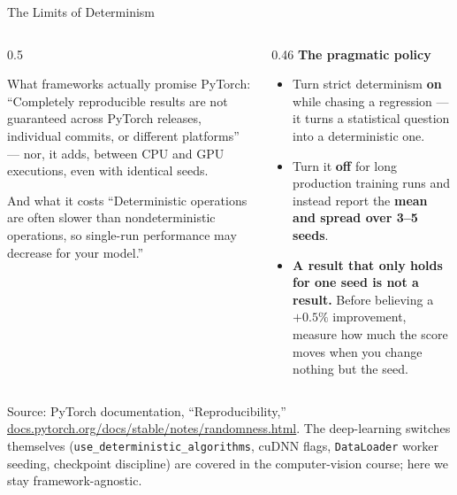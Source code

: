 \begin{frame}{The Limits of Determinism}

    \begin{columns}[T]
        \begin{column}{0.5\textwidth}
            \begin{alertblock}{What frameworks actually promise}
                \small PyTorch: ``Completely reproducible results are not guaranteed across PyTorch
                releases, individual commits, or different platforms'' --- nor, it adds, between CPU and
                GPU executions, even with identical seeds.
            \end{alertblock}
            \vspace{0.4em}
            \begin{block}{And what it costs}
                \small ``Deterministic operations are often slower than nondeterministic operations, so
                single-run performance may decrease for your model.''
            \end{block}
        \end{column}
        \begin{column}{0.46\textwidth}
            \small
            \textbf{The pragmatic policy}
            \begin{itemize}
                \item Turn strict determinism \textbf{on} while chasing a regression --- it turns a
                      statistical question into a deterministic one.
                \item Turn it \textbf{off} for long production training runs and instead report the
                      \textbf{mean and spread over 3--5 seeds}.
                \item \textbf{A result that only holds for one seed is not a result.} Before believing a
                      $+0.5\%$ improvement, measure how much the score moves when you change nothing but
                      the seed.
            \end{itemize}
        \end{column}
    \end{columns}

    \vspace{0.6em}
    {\scriptsize Source: PyTorch documentation, ``Reproducibility,''
    \href{https://docs.pytorch.org/docs/stable/notes/randomness.html}{docs.pytorch.org/docs/stable/notes/randomness.html}.
    The deep-learning switches themselves (\texttt{use\_deterministic\_algorithms}, cuDNN flags,
    \texttt{DataLoader} worker seeding, checkpoint discipline) are covered in the
    computer-vision course; here we stay framework-agnostic.}

\end{frame}

